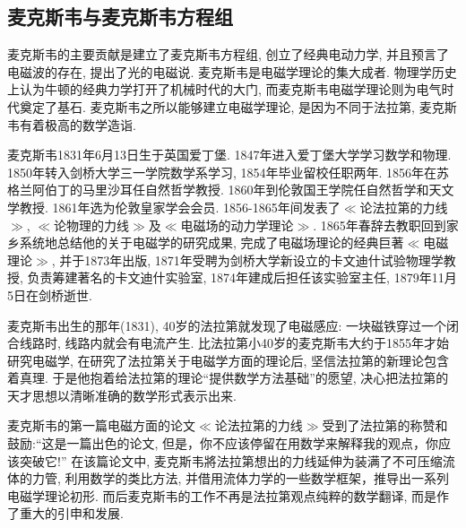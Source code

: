 \documentclass[11pt,a4paper,boxed]{caspset}
\newlength\picwidth
\newlength\pichigh
\begin{document}
\subsection{麦克斯韦与麦克斯韦方程组}
麦克斯韦的主要贡献是建立了麦克斯韦方程组, 创立了经典电动力学, 并且预言了电磁波的存在,
提出了光的电磁说. 麦克斯韦是电磁学理论的集大成者.
物理学历史上认为牛顿的经典力学打开了机械时代的大门, 而麦克斯韦电磁学理论则为电气时代奠定了基石.
麦克斯韦之所以能够建立电磁学理论, 是因为不同于法拉第, 麦克斯韦有着极高的数学造诣.
\begin{window}
麦克斯韦1831年6月13日生于英国爱丁堡. 1847年进入爱丁堡大学学习数学和物理. 1850年转入剑桥大学三一学院数学系学习, 1854年毕业留校任职两年. 1856年在苏格兰阿伯丁的马里沙耳任自然哲学教授. 1860年到伦敦国王学院任自然哲学和天文学教授. 1861年选为伦敦皇家学会会员.
1856-1865年间发表了$\ll$论法拉第的力线$\gg$, $\ll$论物理的力线$\gg$及$\ll$电磁场的动力学理论$\gg$.
1865年春辞去教职回到家乡系统地总结他的关于电磁学的研究成果, 完成了电磁场理论的经典巨著$\ll$电磁理论$\gg$, 并于1873年出版, 1871年受聘为剑桥大学新设立的卡文迪什试验物理学教授, 负责筹建著名的卡文迪什实验室, 1874年建成后担任该实验室主任, 1879年11月5日在剑桥逝世.
\end{window}

麦克斯韦出生的那年(1831), 40岁的法拉第就发现了电磁感应: 一块磁铁穿过一个闭合线路时, 线路内就会有电流产生.
比法拉第小40岁的麦克斯韦大约于1855年才始研究电磁学, 在研究了法拉第关于电磁学方面的理论后, 坚信法拉第的新理论包含着真理. 于是他抱着给法拉第的理论``提供数学方法基础''的愿望, 决心把法拉第的天才思想以清晰准确的数学形式表示出来.

麦克斯韦的第一篇电磁方面的论文$\ll$论法拉第的力线$\gg$受到了法拉第的称赞和鼓励:``这是一篇出色的论文, 但是，你不应该停留在用数学来解释我的观点，你应该突破它!''
在该篇论文中, 麦克斯韦將法拉第想出的力线延伸为装满了不可压缩流体的力管, 利用数学的类比方法, 并借用流体力学的一些数学框架，推导出一系列电磁学理论初形.
而后麦克斯韦的工作不再是法拉第观点纯粹的数学翻译, 而是作了重大的引申和发展.
\end{document}
